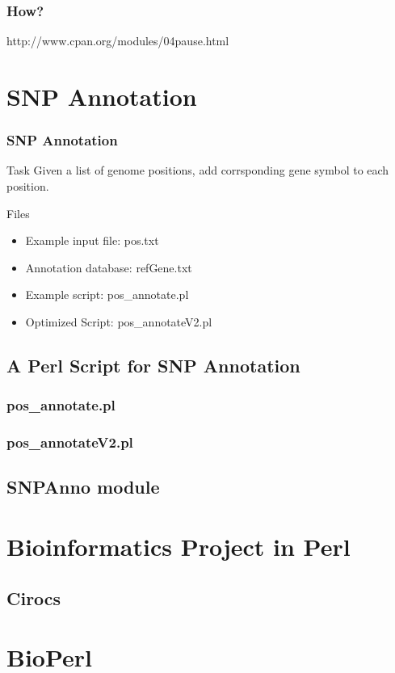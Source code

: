 \documentclass[UTF8]{beamer}
\begin{document}
\begin{frame}
  \frametitle{How?}
  http://www.cpan.org/modules/04pause.html
\end{frame}

\section{SNP Annotation}

\begin{frame}
  \frametitle{SNP Annotation}
  \begin{block}{Task}
    Given a list of genome positions, add corrsponding gene symbol to each
    position.
  \end{block}
  \begin{block}{Files}
    \begin{itemize}
      \item Example input file: pos.txt
      \item Annotation database: refGene.txt
      \item Example script: pos_annotate.pl
      \item Optimized Script: pos_annotateV2.pl
    \end{itemize}
  \end{block}
\end{frame}

\subsection{A Perl Script for SNP Annotation}
\begin{frame}
  \frametitle{pos_annotate.pl}
\end{frame}

\begin{frame}
  \frametitle{pos_annotateV2.pl}
\end{frame}

\subsection{SNPAnno module}

\section{Bioinformatics Project in Perl}
\subsection{Cirocs}

\section{BioPerl}
\end{document}
